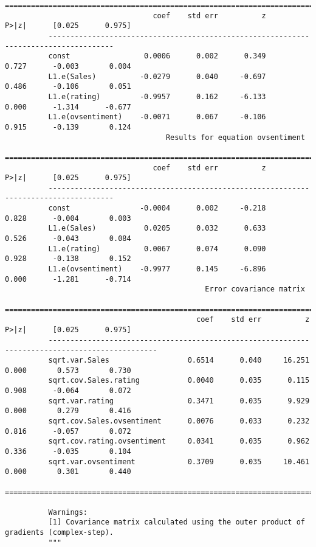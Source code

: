 \documentclass[11pt]{article}
\begin{document}
\begin{Verbatim}[commandchars=\\\{\}]
          =====================================================================================
                                  coef    std err          z      P>|z|      [0.025      0.975]
          -------------------------------------------------------------------------------------
          const                 0.0006      0.002      0.349      0.727      -0.003       0.004
          L1.e(Sales)          -0.0279      0.040     -0.697      0.486      -0.106       0.051
          L1.e(rating)         -0.9957      0.162     -6.133      0.000      -1.314      -0.677
          L1.e(ovsentiment)    -0.0071      0.067     -0.106      0.915      -0.139       0.124
                                     Results for equation ovsentiment                          
          =====================================================================================
                                  coef    std err          z      P>|z|      [0.025      0.975]
          -------------------------------------------------------------------------------------
          const                -0.0004      0.002     -0.218      0.828      -0.004       0.003
          L1.e(Sales)           0.0205      0.032      0.633      0.526      -0.043       0.084
          L1.e(rating)          0.0067      0.074      0.090      0.928      -0.138       0.152
          L1.e(ovsentiment)    -0.9977      0.145     -6.896      0.000      -1.281      -0.714
                                              Error covariance matrix                                    
          ===============================================================================================
                                            coef    std err          z      P>|z|      [0.025      0.975]
          -----------------------------------------------------------------------------------------------
          sqrt.var.Sales                  0.6514      0.040     16.251      0.000       0.573       0.730
          sqrt.cov.Sales.rating           0.0040      0.035      0.115      0.908      -0.064       0.072
          sqrt.var.rating                 0.3471      0.035      9.929      0.000       0.279       0.416
          sqrt.cov.Sales.ovsentiment      0.0076      0.033      0.232      0.816      -0.057       0.072
          sqrt.cov.rating.ovsentiment     0.0341      0.035      0.962      0.336      -0.035       0.104
          sqrt.var.ovsentiment            0.3709      0.035     10.461      0.000       0.301       0.440
          ===============================================================================================
          
          Warnings:
          [1] Covariance matrix calculated using the outer product of gradients (complex-step).
          """
\end{Verbatim}
            
\end{document}
